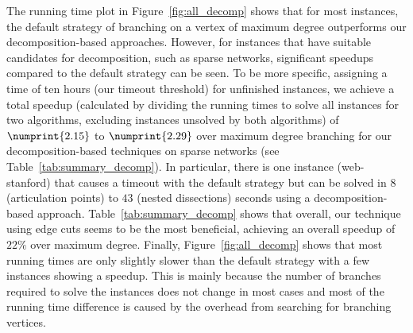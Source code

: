 \documentclass[a4paper,UKenglish,cleveref, autoref, thm-restate]{lipics-v2021}
\begin{document}
The running time plot in Figure~\ref{fig:all_decomp} shows that for most instances, the default strategy of branching on a
vertex of maximum degree outperforms our decomposition-based approaches.
However, for instances that have suitable candidates for decomposition, such as
sparse networks, significant speedups compared to the default strategy can be
seen. To be more specific, assigning a time of ten hours (our timeout threshold) for unfinished
instances, we achieve a total speedup (calculated by dividing the running times
to solve all instances for two algorithms, excluding instances unsolved by both
algorithms) of $\numprint{2.15}$ to $\numprint{2.29}$ over maximum degree branching for our
decomposition-based techniques on sparse networks (see
Table~\ref{tab:summary_decomp}). In particular, there is one instance (web-stanford) that causes a timeout with the
default strategy but can be solved in $8$ (articulation points) to $43$ (nested
dissections) seconds using a decomposition-based approach. Table~\ref{tab:summary_decomp} shows that overall, our
technique using edge cuts seems to be the most beneficial, achieving an overall
speedup of $22\%$ over maximum degree.
Finally, Figure~\ref{fig:all_decomp} shows that most running
times are only slightly slower than the default strategy with a few instances
showing a speedup. This is mainly because
the number of branches required to solve the instances does not change in most
cases and most of the running time
difference is caused by the overhead from
searching for branching vertices.%
\end{document}
